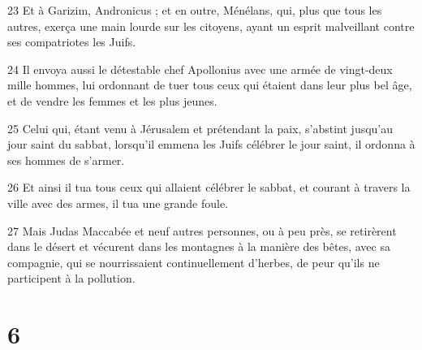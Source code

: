 \par 23 Et à Garizim, Andronicus ; et en outre, Ménélans, qui, plus que tous les autres, exerça une main lourde sur les citoyens, ayant un esprit malveillant contre ses compatriotes les Juifs.
\par 24 Il envoya aussi le détestable chef Apollonius avec une armée de vingt-deux mille hommes, lui ordonnant de tuer tous ceux qui étaient dans leur plus bel âge, et de vendre les femmes et les plus jeunes.
\par 25 Celui qui, étant venu à Jérusalem et prétendant la paix, s'abstint jusqu'au jour saint du sabbat, lorsqu'il emmena les Juifs célébrer le jour saint, il ordonna à ses hommes de s'armer.
\par 26 Et ainsi il tua tous ceux qui allaient célébrer le sabbat, et courant à travers la ville avec des armes, il tua une grande foule.
\par 27 Mais Judas Maccabée et neuf autres personnes, ou à peu près, se retirèrent dans le désert et vécurent dans les montagnes à la manière des bêtes, avec sa compagnie, qui se nourrissaient continuellement d'herbes, de peur qu'ils ne participent à la pollution.

\chapter{6}

